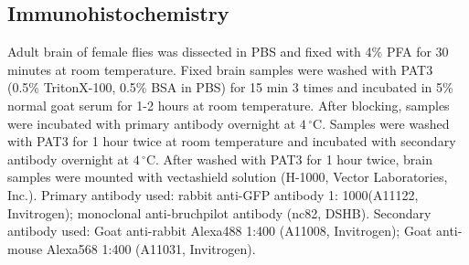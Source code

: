 \subsection*{Immunohistochemistry}

Adult brain of female flies was dissected in PBS and fixed with 4\% PFA for 30 minutes at room temperature.
Fixed brain samples were washed with PAT3 (0.5\% TritonX-100, 0.5\% BSA in PBS) for 15 min 3 times and incubated in 5\% normal goat serum for 1-2 hours at room temperature.
After blocking, samples were incubated with primary antibody overnight at $4\,^{\circ}\mathrm{C}$.
Samples were washed with PAT3 for 1 hour twice at room temperature and incubated with secondary antibody overnight at $4\,^{\circ}\mathrm{C}$.
After washed with PAT3 for 1 hour twice, brain samples were mounted with vectashield solution (H-1000, Vector Laboratories, Inc.).
Primary antibody used: rabbit anti-GFP antibody 1: 1000(A11122, Invitrogen); monoclonal anti-bruchpilot antibody (nc82, DSHB).
Secondary antibody used: Goat anti-rabbit Alexa488 1:400 (A11008, Invitrogen); Goat anti-mouse Alexa568 1:400 (A11031, Invitrogen).
    
    